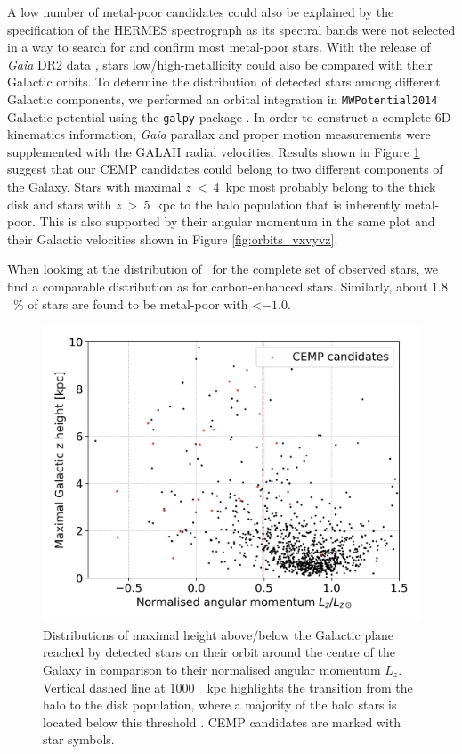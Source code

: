 A low number of metal-poor candidates could also be explained by the specification of the HERMES spectrograph as its spectral bands were not selected in a way to search for and confirm most metal-poor stars. With the release of {\it Gaia} DR2 data \citep{2018A&A...616A...1G}, stars low/high-metallicity could also be compared with their Galactic orbits. To determine the distribution of detected stars among different Galactic components, we performed an orbital integration in \texttt{MWPotential2014} Galactic potential using the \texttt{galpy} package \citep{2015ApJS..216...29B}. In order to construct a complete 6D kinematics information, {\it Gaia} parallax and proper motion measurements were supplemented with the GALAH radial velocities. Results shown in Figure \ref{fig:orbits_zmax} suggest that our CEMP candidates could belong to two different components of the Galaxy. Stars with maximal $z$~<~4~kpc most probably belong to the thick disk and stars with $z$~>~5~kpc to the halo population that is inherently metal-poor. This is also supported by their angular momentum in the same plot and their Galactic velocities shown in Figure \ref{fig:orbits_vxvyvz}.

When looking at the distribution of \Feh\ for the complete set of observed stars, we find a comparable distribution as for carbon-enhanced stars. Similarly, about $1.8$~\% of stars are found to be metal-poor with \Feh \textless $-1.0$.

\begin{figure}
	\centering
	\includegraphics[width=\columnwidth]{carbon_orbits_zmax_lznorm.png}
	\caption{Distributions of maximal height above/below the Galactic plane reached by detected stars on their orbit around the centre of the Galaxy in comparison to their normalised angular momentum $L_z$. Vertical dashed line at $1000$~\kms~kpc highlights the transition from the halo to the disk population, where a majority of the halo stars is located below this threshold \citep[the threshold was visually estimated from similar plots in][]{2018ApJ...860L..11K}.  CEMP candidates are marked with star symbols.}
	\label{fig:orbits_zmax}
\end{figure}

